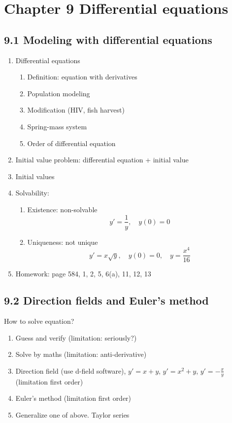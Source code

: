 \documentclass{article}
\begin{document}
\section{Chapter 9 Differential equations}


\subsection{9.1 Modeling with differential equations}
\begin{enumerate}
\item Differential equations
\begin{enumerate}
\item Definition: equation with derivatives
\item Population modeling
\item[] Modification (HIV, fish harvest)
\item Spring-mass system
\item Order of differential equation
\end{enumerate}
\item Initial value problem: differential equation + initial value
\item[] Initial values
\item Solvability:
\begin{enumerate}
\item Existence: non-solvable
$$
y ' = \frac{1}{y},\quad y(0) = 0
$$
\item Uniqueness: not unique
$$
y ' = x\sqrt{y}, \quad y(0) = 0, \quad y = \frac{x^4}{16}
$$

\end{enumerate}
\item Homework: page 584, 1, 2, 5, 6(a), 11, 12, 13
\end{enumerate}

\subsection{9.2 Direction fields and Euler's method}
How to solve equation?
\begin{enumerate}
\item Guess and verify (limitation: seriously?)
\item Solve by maths (limitation: anti-derivative)
\item Direction field (use d-field software), $y' = x+y$, $y' = x^2+y$, $y' = -\frac{x}{y}$ (limitation first order)
\item Euler's method (limitation first order)
\item Generalize one of above. Taylor series
\end{enumerate}
\end{document}
